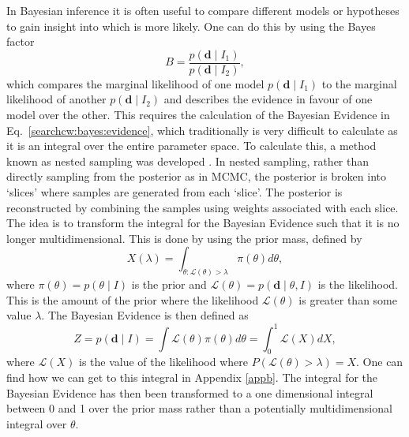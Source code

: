 In Bayesian inference it is often useful to compare different models or hypotheses to gain insight into which is more likely. One can do this by using the Bayes
factor
%
\begin{equation}
B = \frac{p({\bm d} \mid I_1)}{p({\bm d} \mid I_2)},
\end{equation}
%
which compares the marginal likelihood of one model $p({\bm d} \mid I_1)$ to the marginal likelihood of another $p({\bm d} \mid I_2)$ and describes the evidence in favour of one model over the other.
This requires the calculation of the Bayesian Evidence in Eq.~\ref{searchcw:bayes:evidence}, which traditionally is very difficult to calculate as it is an integral over the entire parameter space. To calculate this, a method known as nested sampling was developed
\citep{skilling2006NestedSampling,speagle2019DynestyDynamic}.
In nested sampling, rather than directly sampling from the posterior as in \gls{MCMC}, the posterior is broken into `slices' where samples are generated from each `slice'.
The posterior is reconstructed by combining the samples using weights associated with each slice.
The idea is to transform the integral for the Bayesian Evidence such that it is no longer multidimensional.
This is done by using the prior mass, defined by
\begin{equation}
\label{searchcw:bayes:nested:priormass}
X(\lambda) = \int_{\theta: \mathcal{L}(\theta) > \lambda} \pi(\theta) d\theta,
\end{equation}
where $\pi(\theta) = p(\theta \mid I)$ is the prior and $\mathcal{L}(\theta)=p(\bm{d} \mid \theta, I)$ is the likelihood. This is the amount of the prior where the likelihood $\mathcal{L}(\theta)$ is greater than some value $\lambda$.
The Bayesian Evidence is then defined as 
\begin{equation}
\label{searchcw:bayes:nested:evidence}
Z = p(\bm{d} \mid I) = \int \mathcal{L}(\theta) \pi(\theta) d\theta = \int_0^1 \mathcal{L}(X) dX,
\end{equation}
where $\mathcal{L}(X)$ is the value of the likelihood where $P(\mathcal{L}(\theta) > \lambda) = X$. One can find how we can get to this integral in Appendix \ref{appb}.
The integral for the Bayesian Evidence has then been transformed to a one dimensional integral between 0 and 1 over the prior mass rather than a potentially multidimensional integral over $\theta$.

